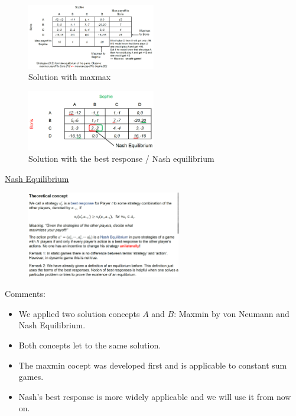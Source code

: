 \begin{figure}[H]
    \centering
    \includegraphics[width=0.5\textwidth]{Pictures/example_10_maxmax.png}
    \caption{Solution with maxmax}
\end{figure}

\begin{figure}[H]
    \centering
    \includegraphics[width=0.5\textwidth]{Pictures/example_10_best_response.png}
    \caption{Solution with the best response / Nash equilibrium}
\end{figure}

\underline{Nash Equilibrium}

\begin{figure}[H]
    \centering
    \includegraphics[width=0.6\textwidth]{Pictures/nash_equilibrium.png}
\end{figure}

Comments:
\begin{itemize}
    \item We applied two solution concepts $A$ and $B$: Maxmin by von Neumann
        and Nash Equilibrium.
    \item Both concepts let to the same solution.
    \item The maxmin cocept was developed first and is applicable to constant
        sum games.
    \item Nash's best response is more widely applicable and we will use it from
        now on.
\end{itemize}

